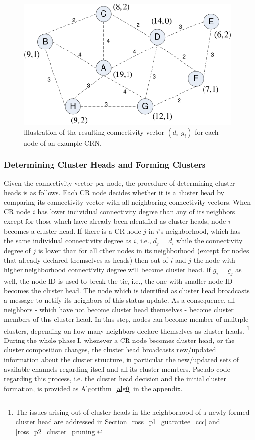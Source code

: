 \documentclass[times]{ettauth}
\newcommand{\ie}{i.e., }
\theoremstyle{mytheoremstyle}
\theoremstyle{mytheoremstyle}
\theoremstyle{mytheoremstyle}
\begin{document}
\begin{figure}[ht!]
  \centering
\includegraphics[width=0.7\linewidth]{figure1.pdf}
	\caption{Illustration of the resulting connectivity vector $(d_i, g_i)$ for each node of an example CRN.}
	\label{fig1}
\end{figure}

\subsubsection{Determining Cluster Heads and Forming Clusters}
Given the connectivity vector per node, the procedure of determining cluster heads is as follows.
Each CR node decides whether it is a cluster head by comparing its connectivity vector with all neighboring connectivity vectors.
When CR node $i$ has lower individual connectivity degree than any of its neighbors except for those which have already been identified as cluster heads, node $i$ becomes a cluster head.
If there is a CR node $j$ in $i$'s neighborhood, which has the same individual connectivity degree as $i$, \ie $d_j = d_i$ while the connectivity degree of $j$ is lower than for all other nodes in its neighborhood (except for nodes that already declared themselves as heads) then out of $i$ and $j$ the node with higher neighborhood connectivity degree will become cluster head.
If $g_i = g_j$ as well, the node ID is used to break the tie, \ie the one with smaller node ID becomes the cluster head.
%
The node which is identified as cluster head broadcasts a message to notify its neighbors of this status update. 
As a consequence, all neighbors - which have not become cluster head themselves -  become cluster members of this cluster head.
In this step, nodes can become member of multiple clusters, depending on how many neighbors declare themselves as cluster heads.
\footnote{The issues arising out of cluster heads in the neighborhood of a newly formed cluster head are addressed in Section~\ref{ross_p1_guarantee_ccc} and \ref{ross_p2_cluster_pruning}}
During the whole phase I, whenever a CR node becomes cluster head, or the cluster composition changes, the cluster head broadcasts new/updated information about the cluster structure, in particular the new/updated sets of available channels regarding itself and all its cluster members.
Pseudo code regarding this process, i.e. the cluster head decision and the initial cluster formation, is provided as Algorithm~\ref{alg0} in the appendix.
\end{document}
